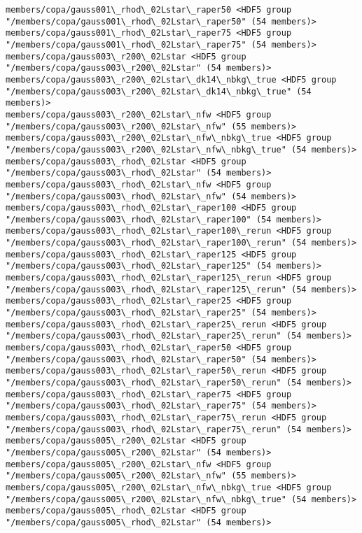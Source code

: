\documentclass[11pt]{article}
\begin{document}
\begin{Verbatim}[commandchars=\\\{\}]
members/copa/gauss001\_rhod\_02Lstar\_raper50 <HDF5 group "/members/copa/gauss001\_rhod\_02Lstar\_raper50" (54 members)>
members/copa/gauss001\_rhod\_02Lstar\_raper75 <HDF5 group "/members/copa/gauss001\_rhod\_02Lstar\_raper75" (54 members)>
members/copa/gauss003\_r200\_02Lstar <HDF5 group "/members/copa/gauss003\_r200\_02Lstar" (54 members)>
members/copa/gauss003\_r200\_02Lstar\_dk14\_nbkg\_true <HDF5 group "/members/copa/gauss003\_r200\_02Lstar\_dk14\_nbkg\_true" (54 members)>
members/copa/gauss003\_r200\_02Lstar\_nfw <HDF5 group "/members/copa/gauss003\_r200\_02Lstar\_nfw" (55 members)>
members/copa/gauss003\_r200\_02Lstar\_nfw\_nbkg\_true <HDF5 group "/members/copa/gauss003\_r200\_02Lstar\_nfw\_nbkg\_true" (54 members)>
members/copa/gauss003\_rhod\_02Lstar <HDF5 group "/members/copa/gauss003\_rhod\_02Lstar" (54 members)>
members/copa/gauss003\_rhod\_02Lstar\_nfw <HDF5 group "/members/copa/gauss003\_rhod\_02Lstar\_nfw" (54 members)>
members/copa/gauss003\_rhod\_02Lstar\_raper100 <HDF5 group "/members/copa/gauss003\_rhod\_02Lstar\_raper100" (54 members)>
members/copa/gauss003\_rhod\_02Lstar\_raper100\_rerun <HDF5 group "/members/copa/gauss003\_rhod\_02Lstar\_raper100\_rerun" (54 members)>
members/copa/gauss003\_rhod\_02Lstar\_raper125 <HDF5 group "/members/copa/gauss003\_rhod\_02Lstar\_raper125" (54 members)>
members/copa/gauss003\_rhod\_02Lstar\_raper125\_rerun <HDF5 group "/members/copa/gauss003\_rhod\_02Lstar\_raper125\_rerun" (54 members)>
members/copa/gauss003\_rhod\_02Lstar\_raper25 <HDF5 group "/members/copa/gauss003\_rhod\_02Lstar\_raper25" (54 members)>
members/copa/gauss003\_rhod\_02Lstar\_raper25\_rerun <HDF5 group "/members/copa/gauss003\_rhod\_02Lstar\_raper25\_rerun" (54 members)>
members/copa/gauss003\_rhod\_02Lstar\_raper50 <HDF5 group "/members/copa/gauss003\_rhod\_02Lstar\_raper50" (54 members)>
members/copa/gauss003\_rhod\_02Lstar\_raper50\_rerun <HDF5 group "/members/copa/gauss003\_rhod\_02Lstar\_raper50\_rerun" (54 members)>
members/copa/gauss003\_rhod\_02Lstar\_raper75 <HDF5 group "/members/copa/gauss003\_rhod\_02Lstar\_raper75" (54 members)>
members/copa/gauss003\_rhod\_02Lstar\_raper75\_rerun <HDF5 group "/members/copa/gauss003\_rhod\_02Lstar\_raper75\_rerun" (54 members)>
members/copa/gauss005\_r200\_02Lstar <HDF5 group "/members/copa/gauss005\_r200\_02Lstar" (54 members)>
members/copa/gauss005\_r200\_02Lstar\_nfw <HDF5 group "/members/copa/gauss005\_r200\_02Lstar\_nfw" (55 members)>
members/copa/gauss005\_r200\_02Lstar\_nfw\_nbkg\_true <HDF5 group "/members/copa/gauss005\_r200\_02Lstar\_nfw\_nbkg\_true" (54 members)>
members/copa/gauss005\_rhod\_02Lstar <HDF5 group "/members/copa/gauss005\_rhod\_02Lstar" (54 members)>

\end{Verbatim}
\end{document}
